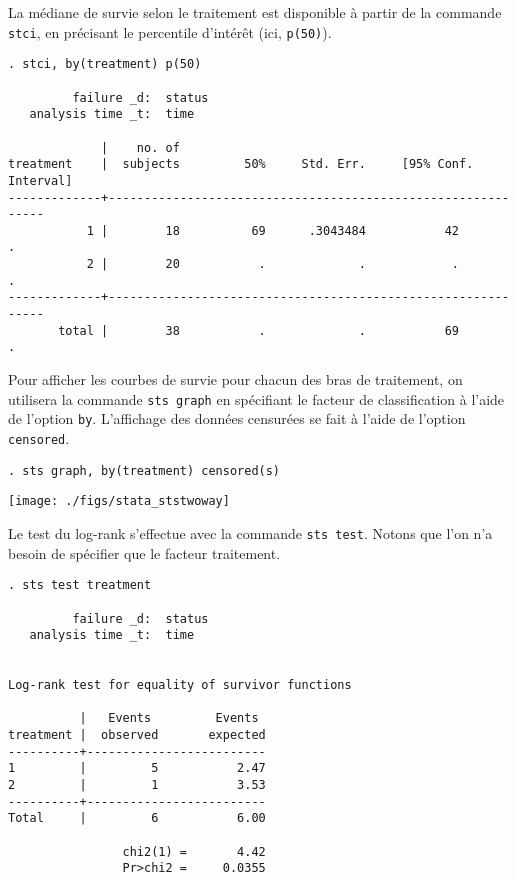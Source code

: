 La médiane de survie selon le traitement est disponible à partir de la
commande \texttt{stci}, en précisant le percentile d'intérêt (ici,
\texttt{p(50)}). 
\begin{verbatim}
. stci, by(treatment) p(50)

         failure _d:  status
   analysis time _t:  time

             |    no. of 
treatment    |  subjects         50%     Std. Err.     [95% Conf. Interval]
-------------+-------------------------------------------------------------
           1 |        18          69      .3043484           42          .
           2 |        20           .             .            .          .
-------------+-------------------------------------------------------------
       total |        38           .             .           69          .
\end{verbatim}

Pour afficher les courbes de survie pour chacun des bras de traitement, on
utilisera la commande \texttt{sts graph} en spécifiant le facteur de
classification à l'aide de l'option \texttt{by}. L'affichage des données
censurées se fait à l'aide de l'option \texttt{censored}.
\begin{verbatim}
. sts graph, by(treatment) censored(s)
\end{verbatim}

\texttt{[image: ./figs/stata\_ststwoway]}

Le test du log-rank s'effectue avec la commande \texttt{sts test}. Notons
que l'on n'a besoin de spécifier que le facteur traitement.
\begin{verbatim}
. sts test treatment

         failure _d:  status
   analysis time _t:  time


Log-rank test for equality of survivor functions

          |   Events         Events
treatment |  observed       expected
----------+-------------------------
1         |         5           2.47
2         |         1           3.53
----------+-------------------------
Total     |         6           6.00

                chi2(1) =       4.42
                Pr>chi2 =     0.0355
\end{verbatim}

